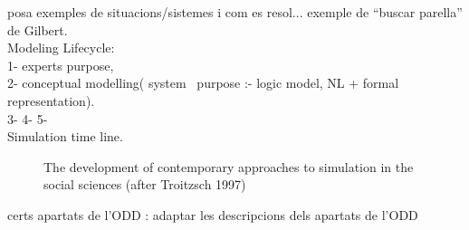 \documentclass{report}
\begin{document}
posa exemples de situacions/sistemes i com es resol... exemple de ``buscar parella'' de Gilbert.
\\
Modeling Lifecycle:\\ 
1- experts purpose,\\
2- conceptual modelling( system \ purpose :- logic model, NL + formal representation).\\
3- 
4- 
5- 
\\
Simulation time line.\\
\begin{figure}[tp]
\setlength\fboxsep{0pt}
\setlength\fboxrule{0.5pt}
\caption{The development of contemporary approaches to simulation in the social sciences (after Troitzsch 1997)}
\label{fig:SimTL}
\end{figure}

certs apartats de l'ODD : adaptar les descripcions dels apartats de l'ODD




\end{document}
